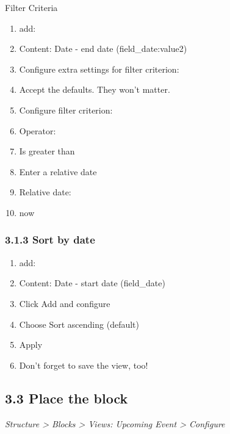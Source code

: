 \documentclass[letterpaper,10pt,english]{sphinxmanual}
\begin{document}
Filter Criteria
\begin{enumerate}
\item {} 
add:

\item {} 
Content: Date - end date (field\_date:value2)

\item {} 
Configure extra settings for filter criterion:

\item {} 
Accept the defaults. They won't matter.

\item {} 
Configure filter criterion:

\item {} 
Operator:

\item {} 
Is greater than

\item {} 
Enter a relative date

\item {} 
Relative date:

\item {} 
now

\end{enumerate}


\subsubsection{3.1.3 Sort by date}
\label{event_calendar:sort-by-date}\begin{enumerate}
\item {} 
add:

\item {} 
Content: Date - start date (field\_date)

\item {} 
Click Add and configure

\item {} 
Choose Sort ascending (default)

\item {} 
Apply

\item {} 
Don't forget to save the view, too!

\end{enumerate}


\subsection{3.3 Place the block}
\label{event_calendar:place-the-block}
\emph{Structure \textgreater{} Blocks \textgreater{} Views: Upcoming Event \textgreater{} Configure}
\end{document}
